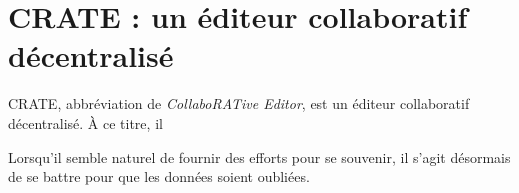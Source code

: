 

\chapter{CRATE : un éditeur collaboratif décentralisé}
\minitoc

\lettrine{C}RATE, abbréviation de \emph{CollaboRATive Editor}, est un éditeur
collaboratif décentralisé. À ce titre, il

Lorsqu'il semble naturel de fournir des efforts pour se souvenir, il s'agit
désormais de se battre pour que les données soient oubliées. 

